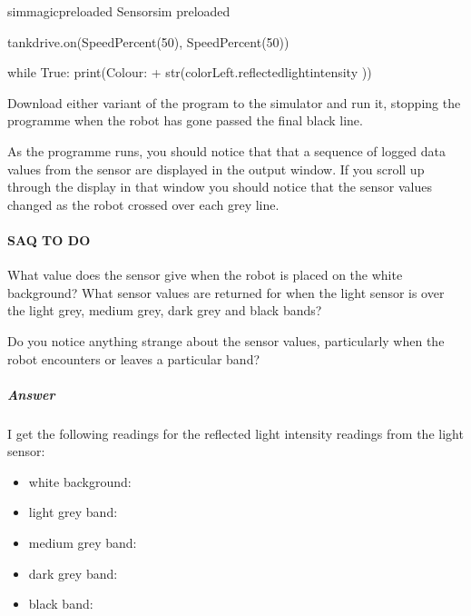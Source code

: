 \documentclass[letterpaper,10pt,english]{sphinxmanual}
\begin{document}
{
\begin{sphinxVerbatim}[commandchars=\\\{\}]
\llap{\color{nbsphinxin}[ ]:\,\hspace{\fboxrule}\hspace{\fboxsep}}\PYGZpc{}\PYGZpc{}sim\PYGZus{}magic\PYGZus{}preloaded
\PYGZsh{} Sensor\PYGZus{}sim preloaded

tank\PYGZus{}drive.on(SpeedPercent(50), SpeedPercent(50))

while True:
    print(\PYGZsq{}Colour: \PYGZsq{} + str(colorLeft.reflected\PYGZus{}light\PYGZus{}intensity ))
\end{sphinxVerbatim}
}

Download either variant of the program to the simulator and run it, stopping the programme when the robot has gone passed the final black line.

As the programme runs, you should notice that that a sequence of logged data values from the sensor are displayed in the output window. If you scroll up through the display in that window you should notice that the sensor values changed as the robot crossed over each grey line.


\paragraph{SAQ TO DO}
\label{\detokenize{content/00_SOFTWARE_GUIDE/Section_00_03_quick_practical_tour:SAQ-TO-DO}}
What value does the sensor give when the robot is placed on the white background? What sensor values are returned for when the light sensor is over the light grey, medium grey, dark grey and black bands?

Do you notice anything strange about the sensor values, particularly when the robot encounters or leaves a particular band?


\subparagraph{Answer}
\label{\detokenize{content/00_SOFTWARE_GUIDE/Section_00_03_quick_practical_tour:Answer}}

I get the following readings for the reflected light intensity readings from the light sensor:
\begin{itemize}
\item {} 
white background: 

\item {} 
light grey band: 

\item {} 
medium grey band: 

\item {} 
dark grey band: 

\item {} 
black band: 

\end{itemize}
\end{document}
